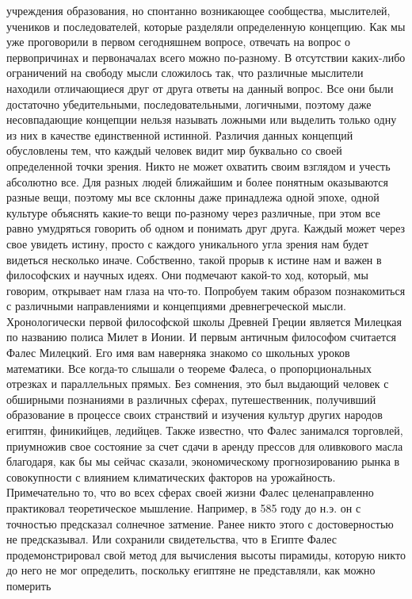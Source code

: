 учреждения образования, но спонтанно возникающее сообщества, мыслителей,
учеников и последователей, которые разделяли определенную концепцию. Как мы уже
проговорили в первом сегодняшнем вопросе, отвечать на вопрос о первопричинах и
первоначалах всего можно по-разному. В отсутствии каких-либо ограничений на
свободу мысли сложилось так, что различные мыслители находили отличающиеся друг
от друга ответы на данный вопрос. Все они были достаточно убедительными,
последовательными, логичными, поэтому даже несовпадающие концепции нельзя
называть ложными или выделить только одну из них в качестве единственной
истинной. Различия данных концепций обусловлены тем, что каждый человек видит
мир буквально со своей определенной точки зрения. Никто не может охватить своим
взглядом и учесть абсолютно все. Для разных людей ближайшим и более понятным
оказываются разные вещи, поэтому мы все склонны даже принадлежа одной эпохе,
одной культуре объяснять какие-то вещи по-разному через различные, при этом все
равно умудряться говорить об одном и понимать друг друга. Каждый может через
свое увидеть истину, просто с каждого уникального угла зрения нам будет видеться
несколько иначе. Собственно, такой прорыв к истине нам и важен в философских и
научных идеях. Они подмечают какой-то ход, который, мы говорим, открывает нам
глаза на что-то. Попробуем таким образом познакомиться с различными
направлениями и концепциями древнегреческой мысли. Хронологически первой
философской школы Древней Греции является Милецкая по названию полиса Милет в
Ионии. И первым античным философом считается Фалес Милецкий. Его имя вам
наверняка знакомо со школьных уроков математики. Все когда-то слышали о теореме
Фалеса, о пропорциональных отрезках и параллельных прямых. Без сомнения, это был
выдающий человек с обширными познаниями в различных сферах, путешественник,
получивший образование в процессе своих странствий и изучения культур других
народов египтян, финикийцев, ледийцев. Также известно, что Фалес занимался
торговлей, приумножив свое состояние за счет сдачи в аренду прессов для
оливкового масла благодаря, как бы мы сейчас сказали, экономическому
прогнозированию рынка в совокупности с влиянием климатических факторов на
урожайность. Примечательно то, что во всех сферах своей жизни Фалес
целенаправленно практиковал теоретическое мышление. Например, в 585 году до н.э.
он с точностью предсказал солнечное затмение. Ранее никто этого с достоверностью
не предсказывал. Или сохранили свидетельства, что в Египте Фалес
продемонстрировал свой метод для вычисления высоты пирамиды, которую никто до
него не мог определить, поскольку египтяне не представляли, как можно померить

